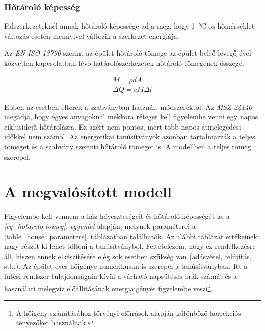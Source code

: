 \subsubsection*{Hőtároló képesség}


Falszerkezeteknél annak hőtároló képessége adja meg, hogy \SI{1}{\celsius}-os hőmérséklet-változás esetén mennyivel változik a szerkezet energiája.

Az \textit{EN ISO 13790} szerint az épület hőtároló tömege az épület belső levegőjével közvetlen kapcsolatban lévő határolószerkezetek hőtároló tömegének összege.

\begin{equation}\label{eq_hotarolo-tomeg}
\begin{aligned}
M= \rho d A\\[10pt]
\Delta Q= cM\Delta t
\end{aligned}
\end{equation}

Ebben az esetben eltérek a szabványban használt módszerektől. Az \textit{MSZ 24140} megadja, hogy egyes anyagoknál mekkora réteget kell figyelembe venni egy napos ciklusidejű hőtárolásra. Ez azért nem pontos, mert több napos átmelegedési időkkel nem számol. Az energetikai tanúsítványok azonban tartalmazzák a teljes tömeget és a szabvány szerinti hőtároló tömeget is. A modellben a teljes tömeg szerepel.




\begin{table}[H]
	\footnotesize
	\centering

	
	\caption{Jelölések}
	\label{tab:Nomenclature}
\end{table}

\section{A megvalósított modell}

Figyelembe kell vennem a ház hőveszteségeit és hőtároló képességét is, a \textit{\ref{eq_hotarolo-tomeg}. egyenlet} alapján, melynek paraméterei a \ref{table_house_parameters}. táblázatban találhatók.
Az alábbi táblázat értékeinek nagy részét ki lehet tölteni a tanúsítványból. Feltételezem, hogy ez rendelkezésre áll, hiszen ennek elkészítésére elég sok esetben szükség van (adásvétel, felújítás, stb.).
Az épület éves hőigénye numerikusan is szerepel a tanúsítványban. Itt a fűtési rendszer tulajdonságain kívül a várható napsütéses órák számát és a használati melegvíz előállításának energiaigényét figyelembe veszi\footnote{A hőigény számításához törvényi előírások alapján különböző korrekciós tényezőket használnak.}.

